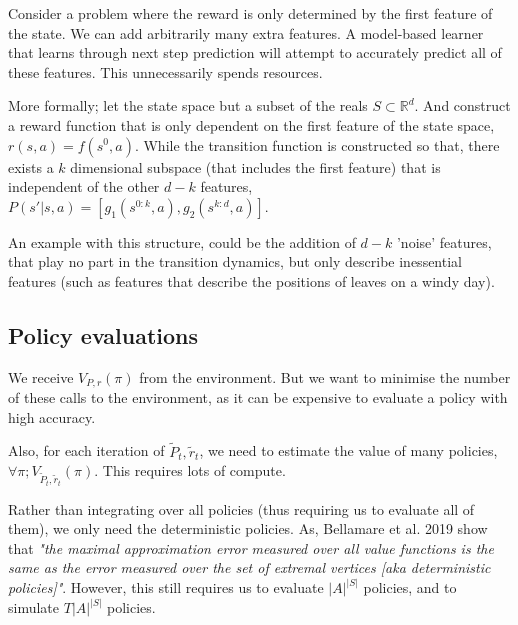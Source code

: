 Consider a problem where the reward is only determined by the first feature of the state.
We can add arbitrarily many extra features. A model-based learner that learns through next step prediction will attempt to
accurately predict all of these features. This unnecessarily spends resources.

More formally; let the state space but a subset of the reals $S \subset \mathbb R^d$.
And construct a reward function that is only dependent on the first feature of the state space, $r(s, a) = f(s^0, a)$.
While the transition function is constructed so that, there exists a $k$ dimensional subspace (that includes the first feature)
that is independent of the other $d-k$ features, $P(s'|s, a) = [g_1(s^{0:k}, a), g_2(s^{k:d}, a)]$.

An example with this structure, could be the addition of $d-k$ 'noise' features,
that play no part in the transition dynamics, but only describe inessential features
(such as features that describe the positions of leaves on a windy day).

%

\subsection{Policy evaluations}

We receive $V_{P, r}(\pi)$ from the environment. But we want to minimise the number
of these calls to the environment, as it can be expensive to evaluate a policy with high accuracy.

Also, for each iteration of $\tilde P_t, \tilde r_t$, we need to estimate the
value of many policies, $\forall \pi; V_{\tilde P_t, \tilde r_t}(\pi)$. This requires lots of compute.

Rather than integrating over all policies (thus requiring us to evaluate all of them),
we only need the deterministic policies. As, Bellamare et al. 2019 show that \textit{"the maximal approximation error
measured over all value functions is the same as the error measured over the set of extremal vertices [aka deterministic policies]"}\cite{Bellemare2019b}.
However, this still requires us to evaluate $|A|^{|S|}$ policies, and to simulate $T |A|^{|S|}$ policies. \footnotemark[32]

